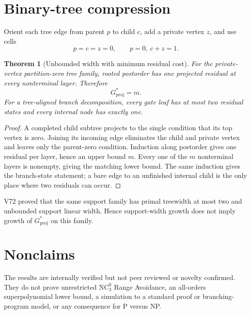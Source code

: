 \documentclass[11pt]{article}
\newtheorem{theorem}{Theorem}
\newcommand{\Gproj}{G_{\mathrm{proj}}}
\begin{document}
\section{Binary-tree compression}

Orient each tree edge from parent $p$ to child $c$, add a private vertex $z$,
and use cells
\[
  p=c=z=0,\qquad p=0,\ c+z=1.
\]

\begin{theorem}[Unbounded width with minimum residual cost]
For the private-vertex partition-zero tree family, rooted postorder has one
projected residual at every nonterminal layer.  Therefore
\[
  \Gproj^*=m.
\]
For a tree-aligned branch decomposition, every gate leaf has at most two
residual states and every internal node has exactly one.
\end{theorem}

\begin{proof}
A completed child subtree projects to the single condition that its top
vertex is zero.  Joining its incoming edge eliminates the child and private
vertex and leaves only the parent-zero condition.  Induction along postorder
gives one residual per layer, hence an upper bound $m$.  Every one of the $m$
nonterminal layers is nonempty, giving the matching lower bound.  The same
induction gives the branch-state statement; a bare edge to an unfinished
internal child is the only place where two residuals can occur.
\end{proof}

V72 proved that the same support family has primal treewidth at most two and
unbounded support linear width.  Hence support-width growth does not imply
growth of $\Gproj^*$ on this family.

\section{Nonclaims}
The results are internally verified but not peer reviewed or novelty
confirmed.  They do not prove unrestricted $\mathrm{NC}^0_3$ Range Avoidance,
an all-orders superpolynomial lower bound, a simulation to a standard proof or
branching-program model, or any consequence for P versus NP.
\end{document}
